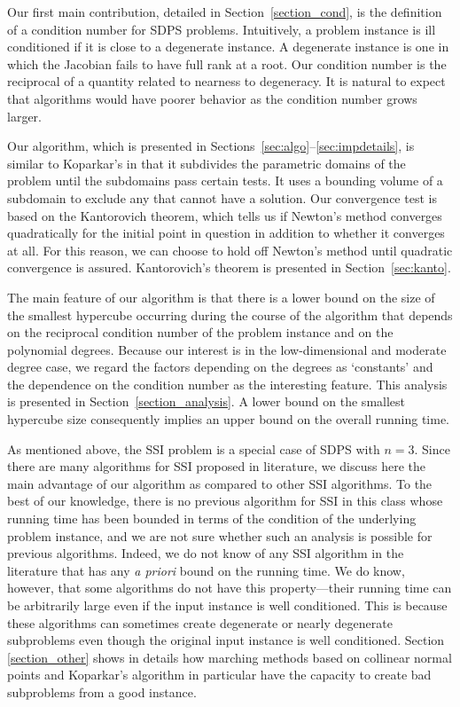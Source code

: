 \documentclass{article}
\begin{document}
Our first main contribution, detailed in Section~\ref{section_cond}, is the
definition of a condition number for SDPS problems.
Intuitively, a problem instance is ill conditioned if it 
is close to a degenerate instance.
A degenerate instance is one in which the Jacobian fails to have full rank at 
a root.  Our condition number is the reciprocal of a quantity
related to nearness to
degeneracy.  It is natural to expect that algorithms would have poorer behavior
as the condition number grows larger.

Our algorithm, which is presented in Sections~\ref{sec:algo}--\ref{sec:impdetails},
is similar to Koparkar's in that it subdivides the
parametric domains of the problem until the subdomains pass
certain tests. It uses a bounding volume of a subdomain to exclude
any that cannot have a solution.  Our convergence test is
based on the Kantorovich theorem, which tells us if Newton's
method converges quadratically for the initial point in question
in addition to whether it converges at all.  
For this reason, we
can choose to hold off Newton's method until quadratic convergence
is assured. Kantorovich's theorem is presented in Section~\ref{sec:kanto}.


The main feature of our algorithm is that there is a lower bound on
the size of the smallest hypercube occurring during the course of the
algorithm that depends on the reciprocal condition number of the
problem instance and on the polynomial degrees.  Because our interest is
in the low-dimensional and moderate degree case, we regard the factors
depending on the degrees as `constants' and the dependence on the
condition number as the interesting feature.
This analysis is presented in
Section~\ref{section_analysis}.  A lower bound on the smallest hypercube
size consequently implies an upper bound on the overall running time.  

As mentioned above, the SSI problem is a special case of SDPS with $n=3$.  Since there are many algorithms for SSI proposed in literature, we discuss here the main advantage of our algorithm as compared to other SSI algorithms.  To the best of our knowledge, there is no previous algorithm for SSI in this class whose running time has been bounded in terms of the condition of
the underlying problem instance, and we are not sure whether such an
analysis is possible for previous algorithms.  Indeed, we do not know
of any SSI algorithm in the literature that has any {\em a priori}
bound on the running time.  We do know, however, that some algorithms
do not have this property---their running time can be arbitrarily
large even if the input instance is well conditioned.  This is because
these algorithms can sometimes create degenerate or nearly degenerate
subproblems even though the original input instance is well
conditioned.  Section \ref{section_other} shows in details how
marching methods based on collinear normal points and Koparkar's
algorithm in particular have the capacity to create bad subproblems
from a good instance.  
\end{document}
